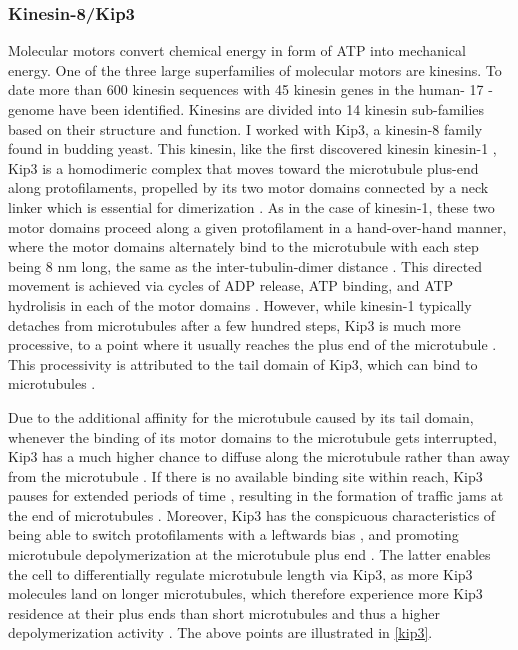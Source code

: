 \subsubsection{Kinesin-8/Kip3}
\label{sec:kip3_intro}
Molecular motors convert chemical energy in form of ATP into mechanical energy. One of the three large superfamilies of molecular motors are kinesins. To date more than 600 kinesin sequences with 45 kinesin genes in the human- 17 -genome \parencite{Endow3420} have been identified. Kinesins are divided into 14 kinesin sub-families based on their structure and function. I worked with Kip3, a kinesin-8 family found in budding yeast. This kinesin, like the first discovered kinesin kinesin-1 \parencite{Endow3420}, Kip3 is a homodimeric complex that moves toward the microtubule plus-end along protofilaments, propelled by its two motor domains connected by a neck linker which is essential for dimerization \parencite{Lin2020}. As in the case of kinesin-1, these two motor domains proceed along a given protofilament in a hand-over-hand manner, where the motor domains alternately bind to the microtubule with each step being 8 nm long, the same as the inter-tubulin-dimer distance \parencite{Xie2021}. This directed movement is achieved via cycles of ADP release, ATP binding, and ATP hydrolisis in each of the motor domains \parencite{Xie2021}. However, while kinesin-1 typically detaches from microtubules after a few hundred steps, Kip3 is much more processive, to a point where it usually reaches the plus end of the microtubule \parencite{Varga2009}. This processivity is attributed to the tail domain of Kip3, which can bind to microtubules \parencite{SU2011751}.\par

Due to the additional affinity for the microtubule caused by its tail domain, whenever the binding of its motor domains to the microtubule gets interrupted, Kip3 has a much higher chance to diffuse along the microtubule rather than away from the microtubule \parencite{Xie2021}. If there is no available binding site within reach, Kip3 pauses for extended periods of time \parencite{Varga2009}, resulting in the formation of traffic jams at the end of microtubules \parencite{Leduc2012}. Moreover, Kip3 has the conspicuous characteristics of being able to switch protofilaments with a leftwards bias \parencite{Bormuth2012}, and promoting microtubule depolymerization at the microtubule plus end \parencite{Lin2020}. The latter enables the cell to differentially regulate microtubule length via Kip3, as more Kip3 molecules land on longer microtubules, which therefore experience more Kip3 residence at their plus ends than short microtubules and thus a higher depolymerization activity \parencite{Varga2009}. The above points are illustrated in \autoref{kip3}.\par

